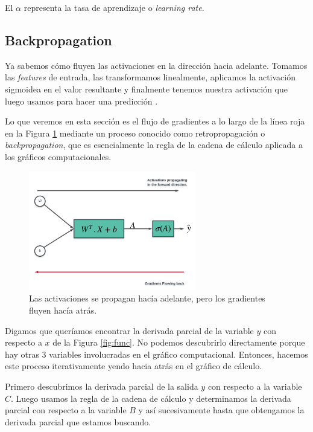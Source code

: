 \documentclass[a4paper,12pt]{article}
\begin{document}
El $\alpha$ representa la tasa de aprendizaje o  \textit{learning rate}.

\subsection{Backpropagation}

Ya sabemos cómo fluyen las activaciones en la dirección hacia adelante. Tomamos las \textit{features} de entrada, las transformamos linealmente, aplicamos la activación sigmoidea en el valor resultante y finalmente tenemos nuestra activación que luego usamos para hacer una predicción \citep{sgd}.

Lo que veremos en esta sección es el flujo de gradientes a lo largo de la línea roja en la Figura \ref{fig:back} mediante un proceso conocido como retropropagación o \textit{backpropagation}, que es esencialmente la regla de la cadena de cálculo aplicada a los gráficos computacionales.

\begin{figure}[H]
	\begin{center}				
	\includegraphics[width=0.65\textwidth]{024.png}
  	\caption{Las activaciones se propagan hacía adelante, pero los gradientes fluyen hacía atrás.}
  	\label{fig:back}
  	\end{center}
\end{figure}

Digamos que queríamos encontrar la derivada parcial de la variable $y$ con respecto a $x$ de la Figura \ref{fig:func}. No podemos descubrirlo directamente porque hay otras 3 variables involucradas en el gráfico computacional. Entonces, hacemos este proceso iterativamente yendo hacia atrás en el gráfico de cálculo.

Primero descubrimos la derivada parcial de la salida $y$ con respecto a la variable $C$. Luego usamos la regla de la cadena de cálculo y determinamos la derivada parcial con respecto a la variable $B$ y así sucesivamente hasta que obtengamos la derivada parcial que estamos buscando.
\end{document}
